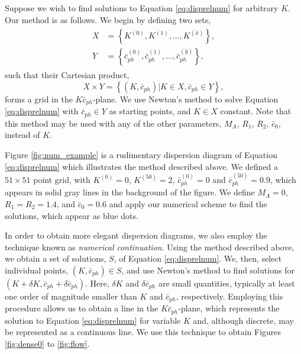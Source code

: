 \documentclass[12pt]{ociamthesis}
\begin{document}
Suppose we wish to find solutions to Equation \eqref{eq:disprelnum} for arbitrary $K$.
Our method is as follows.
We begin by defining two sets,
%
\begin{align}
\begin{split}
X & = \left\{ K^{(0)}, K^{(1)}, \dots, K^{(\hat x)} \right\},
\\
Y & = \left\{ \bar c_{ph}^{(0)}, \bar c_{ph}^{(1)}, \dots, \bar c_{ph}^{(\hat y)} \right\},
\end{split}
\end{align}
%
such that their Cartesian product,
%
\begin{equation}
X \times Y = \left\{ (K, \bar c_{ph}) | K \in X,  \bar c_{ph} \in Y \right\},
\end{equation}
%
forms a grid in the $K \bar c_{ph}$-plane.
We use Newton's method to solve Equation \eqref{eq:disprelnum} with $\bar c_{ph} \in Y$ as starting points, and $K \in X$ constant.
Note that this method may be used with any of the other parameters, $M_A$, $R_1$, $R_2$, $\bar c_0$, instead of $K$.

Figure \ref{fig:num_example} is a rudimentary dispersion diagram of Equation \eqref{eq:disprelnum} which illustrates the method described above.
We defined a $51 \times 51$ point grid, with $K^{(0)} = 0$, $K^{(50)} = 2$, $\bar c_{ph}^{(0)} = 0$ and $\bar c_{ph}^{(50)} = 0.9$, which appears in solid gray lines in the background of the figure.
We define $M_A=0$, $R_1=R_2=1.4$, and $\bar c_0 = 0.6$ and apply our numerical scheme to find the solutions, which appear as blue dots.

In order to obtain more elegant dispersion diagrams, we also employ the technique known as \emph{numerical continuation}.
Using the method described above, we obtain a set of solutions, $S$, of Equation \eqref{eq:disprelnum}.
We, then, select individual points, $(K, \bar c_{ph}) \in S$,  and use Newton's method to find solutions for $(K + \delta K, \bar c_{ph} + \delta \bar c_{ph})$.
Here, $\delta K$ and $\delta \bar c_{ph}$ are small quantities, typically at least one order of magnitude smaller than $K$ and $\bar c_{ph}$, respectively.
Employing this procedure allows us to obtain a line in the $K \bar c_{ph}$-plane, which represents the solution to Equation \eqref{eq:disprelnum} for variable $K$ and, although discrete, may be represented as a continuous line.
We use this technique to obtain Figures \ref{fig:dense0} to \ref{fig:flow}.



\end{document}
